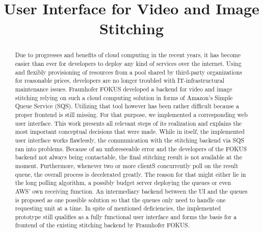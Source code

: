 \documentclass[conference]{IEEEtran}
\begin{document}
\title{User Interface for Video and Image Stitching}

\author{
\and
{}
\and
{}
}

\maketitle

\begin{abstract}
Due to progresses and benefits of cloud computing in the recent years, it has become easier than ever for developers to deploy any kind of services over the internet.
Using and flexibly provisioning of resources from a pool shared by third-party organizations for reasonable prices, developers are no longer troubled with IT-infrastructural maintenance issues.
Fraunhofer FOKUS developed a backend for video and image stitching relying on such a cloud computing solution in forms of Amazon's Simple Queue Service (SQS).
Utilizing that tool however has been rather difficult because a proper frontend is still missing.
For that purpose, we implemented a corresponding web user interface.
This work presents all relevant steps of its realization and explains the most important conceptual decisions that were made.
While in itself, the implemented user interface works flawlessly, the communication with the stitching backend via SQS ran into problems.
Because of an unforeseeable error and the developers of the FOKUS backend not always being contactable, the final stitching result is not available at the moment.
Furthermore, whenever two or more clientS concurrently poll on the result queue, the overall process is decelerated greatly.
The reason for that might either lie in the long polling algorithm, a possibly budget server deploying the queues or even AWS' own receiving function.
An intermediary backend between the UI and the queues is proposed as one possible solution so that the queues only need to handle one requesting unit at a time.
In spite of mentioned deficiencies, the implemented prototype still qualifies as a fully functional user interface and forms the basis for a frontend of the existing stitching backend by Fraunhofer FOKUS.
\end{abstract}
\end{document}
